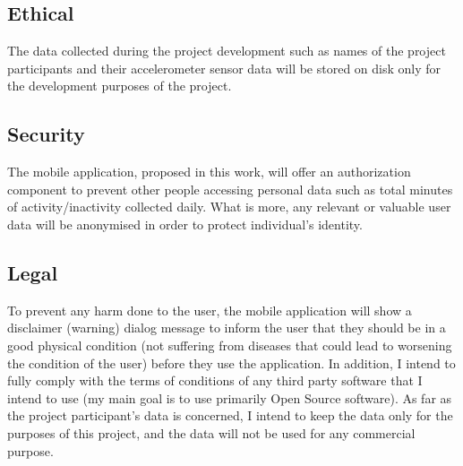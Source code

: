     \subsection{Ethical}
    The data collected during the project development such as names of the project participants and their accelerometer sensor data will be stored on disk only for the development purposes of the project. 
    
    \subsection{Security}
    The mobile application, proposed in this work, will offer an authorization component to prevent other people accessing personal data such as total minutes of activity/inactivity collected daily. What is more, any relevant or valuable user data will be anonymised in order to protect individual’s identity.

    
    \subsection{Legal}
    To prevent any harm done to the user, the mobile application will show a disclaimer (warning) dialog message to inform the user that they should be in a good physical condition (not suffering from diseases that could lead to worsening the condition of the user) before they use the application. In addition, I intend to fully comply with the terms of conditions of any third party software that I intend to use (my main goal is to use primarily Open Source software). As far as the project participant’s data is concerned, I intend to keep the data only for the purposes of this project, and the data will not be used for any commercial purpose. 
